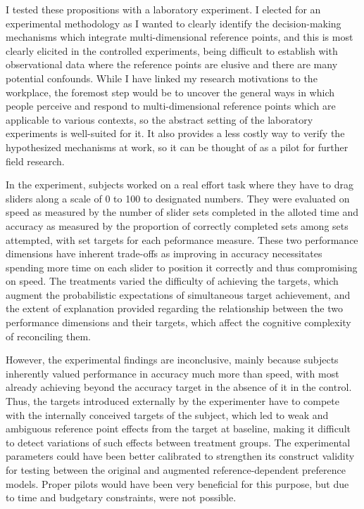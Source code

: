 \documentclass[
  12,
  letterpaper,
  DIV=11,
  numbers=noendperiod]{scrartcl}
\begin{document}
I tested these propositions with a laboratory experiment. I elected for
an experimental methodology as I wanted to clearly identify the
decision-making mechanisms which integrate multi-dimensional reference
points, and this is most clearly elicited in the controlled experiments,
being difficult to establish with observational data where the reference
points are elusive and there are many potential confounds. While I have
linked my research motivations to the workplace, the foremost step would
be to uncover the general ways in which people perceive and respond to
multi-dimensional reference points which are applicable to various
contexts, so the abstract setting of the laboratory experiments is
well-suited for it. It also provides a less costly way to verify the
hypothesized mechanisms at work, so it can be thought of as a pilot for
further field research.

In the experiment, subjects worked on a real effort task where they have
to drag sliders along a scale of 0 to 100 to designated numbers. They
were evaluated on speed as measured by the number of slider sets
completed in the alloted time and accuracy as measured by the proportion
of correctly completed sets among sets attempted, with set targets for
each peformance measure. These two performance dimensions have inherent
trade-offs as improving in accuracy necessitates spending more time on
each slider to position it correctly and thus compromising on speed. The
treatments varied the difficulty of achieving the targets, which augment
the probabilistic expectations of simultaneous target achievement, and
the extent of explanation provided regarding the relationship between
the two performance dimensions and their targets, which affect the
cognitive complexity of reconciling them.

However, the experimental findings are inconclusive, mainly because
subjects inherently valued performance in accuracy much more than speed,
with most already achieving beyond the accuracy target in the absence of
it in the control. Thus, the targets introduced externally by the
experimenter have to compete with the internally conceived targets of
the subject, which led to weak and ambiguous reference point effects
from the target at baseline, making it difficult to detect variations of
such effects between treatment groups. The experimental parameters could
have been better calibrated to strengthen its construct validity for
testing between the original and augmented reference-dependent
preference models. Proper pilots would have been very beneficial for
this purpose, but due to time and budgetary constraints, were not
possible.
\end{document}
